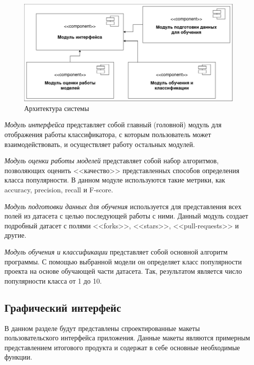 \begin{center}
    \begin{figure}[H]
        \includegraphics[scale=0.5]{pic/architecture.png}
        \caption{Архитектура системы}
        \label{ris:architecture}
    \end{figure}
\end{center}
\vspace{1.5em}

\textit{Модуль интерфейса} представляет собой главный (головной) модуль для отображения работы классификатора, с которым пользователь может взаимодействовать, и осуществляет работу остальных модулей.

\textit{Модуль оценки работы моделей} представляет собой набор алгоритмов, позволяющих оценить <<качество>> представленных способов определения класса популярности. В данном модуле используются такие метрики, как accuracy, precision, recall и F-score.

\textit{Модуль подготовки данных для обучения} используется для представления всех полей из датасета с целью последующей работы с ними. Данный модуль создает подробный датасет с полями <<forks>>, <<stars>>, <<pull-requests>> и другие.

\textit{Модуль обучения и классификации} представляет собой основной алгоритм программы. С помощью выбранной модели он определяет  класс популярности проекта на основе обучающей части датасета. Так, результатом является число популярности класса от 1 до 10.

\subsection{Графический интерфейс}
\label{sec:Graphical-interface}

В данном разделе будут представлены спроектированные макеты пользовательского интерфейса приложения. Данные макеты являются примерным представлением итогового продукта и содержат в себе основные необходимые функции.

